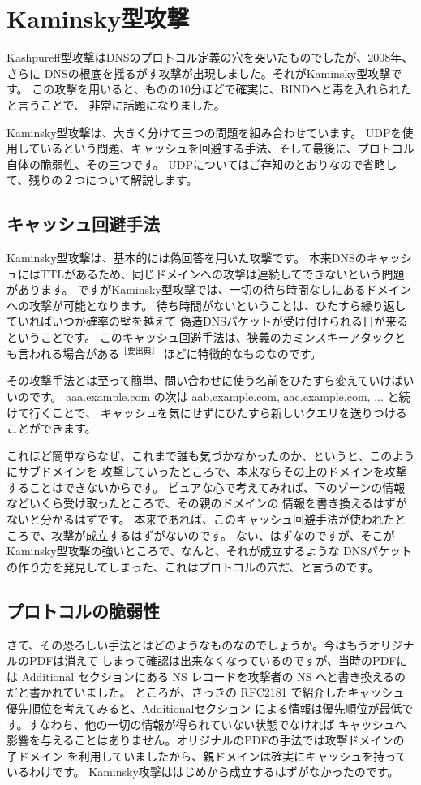\section{Kaminsky型攻撃}
Kashpureff型攻撃はDNSのプロトコル定義の穴を突いたものでしたが、2008年、さらに
DNSの根底を揺るがす攻撃が出現しました。それがKaminsky型攻撃です。
この攻撃を用いると、ものの10分ほどで確実に、BINDへと毒を入れられたと言うことで、
非常に話題になりました。

Kaminsky型攻撃は、大きく分けて三つの問題を組み合わせています。
UDPを使用しているという問題、キャッシュを回避する手法、そして最後に、プロトコル
自体の脆弱性、その三つです。
UDPについてはご存知のとおりなので省略して、残りの２つについて解説します。

\subsection{キャッシュ回避手法}
Kaminsky型攻撃は、基本的には偽回答を用いた攻撃です。
本来DNSのキャッシュにはTTLがあるため、同じドメインへの攻撃は連続してできないという問題があります。
ですがKaminsky型攻撃では、一切の待ち時間なしにあるドメインへの攻撃が可能となります。
待ち時間がないということは、ひたすら繰り返していればいつか確率の壁を越えて
偽造DNSパケットが受け付けられる日が来るということです。
このキャッシュ回避手法は、狭義のカミンスキーアタックとも言われる場合がある$^{［要出典］}$
ほどに特徴的なものなのです。

その攻撃手法とは至って簡単、問い合わせに使う名前をひたすら変えていけばいいのです。
aaa.example.com の次は aab.example.com, aac.example.com, ... と続けて行くことで、
キャッシュを気にせずにひたすら新しいクエリを送りつけることができます。

これほど簡単ならなぜ、これまで誰も気づかなかったのか、というと、このようにサブドメインを
攻撃していったところで、本来ならその上のドメインを攻撃することはできないからです。
ピュアな心で考えてみれば、下のゾーンの情報などいくら受け取ったところで、その親のドメインの
情報を書き換えるはずがないと分かるはずです。
本来であれば、このキャッシュ回避手法が使われたところで、攻撃が成立するはずがないのです。
ない、はずなのですが、そこがKaminsky型攻撃の強いところで、なんと、それが成立するような
DNSパケットの作り方を発見してしまった、これはプロトコルの穴だ、と言うのです。

\subsection{プロトコルの脆弱性}
さて、その恐ろしい手法とはどのようなものなのでしょうか。今はもうオリジナルのPDFは消えて
しまって確認は出来なくなっているのですが、当時のPDFには Additional セクションにある
NS レコードを攻撃者の NS へと書き換えるのだと書かれていました。
ところが、さっきの RFC2181 で紹介したキャッシュ優先順位を考えてみると、Additionalセクション
による情報は優先順位が最低です。すなわち、他の一切の情報が得られていない状態でなければ
キャッシュへ影響を与えることはありません。オリジナルのPDFの手法では攻撃ドメインの子ドメイン
を利用していましたから、親ドメインは確実にキャッシュを持っているわけです。
Kaminsky攻撃ははじめから成立するはずがなかったのです。

